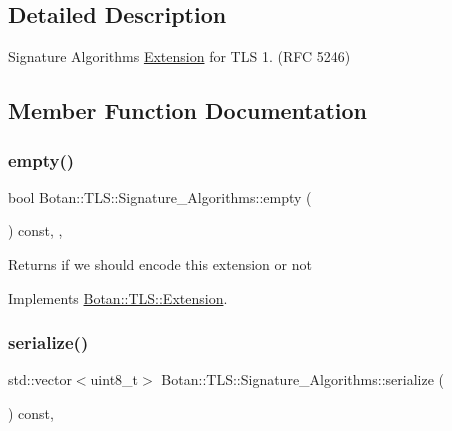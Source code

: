 \subsection{Detailed Description}
Signature Algorithms \hyperlink{class_botan_1_1_t_l_s_1_1_extension}{Extension} for T\+LS 1. (R\+FC 5246) 

\subsection{Member Function Documentation}
\mbox{\label{class_botan_1_1_t_l_s_1_1_signature___algorithms_a7216e44527a194bebce7d616d6d3fe62}} 
\subsubsection{\texorpdfstring{empty()}{empty()}}
{\footnotesize\ttfamily bool Botan\+::\+T\+L\+S\+::\+Signature\+\_\+\+Algorithms\+::empty (\begin{DoxyParamCaption}{ }\end{DoxyParamCaption}) const\hspace{0.3cm}{\ttfamily [inline]}, {\ttfamily [override]}, {\ttfamily [virtual]}}

\begin{DoxyReturn}{Returns}
if we should encode this extension or not 
\end{DoxyReturn}


Implements \hyperlink{class_botan_1_1_t_l_s_1_1_extension_aa850b9be2322f94e7c65e583cd51acc5}{Botan\+::\+T\+L\+S\+::\+Extension}.

\mbox{\label{class_botan_1_1_t_l_s_1_1_signature___algorithms_aa4363eab527673a1474a7e048e0ad616}} 
\subsubsection{\texorpdfstring{serialize()}{serialize()}}
{\footnotesize\ttfamily std\+::vector$<$uint8\+\_\+t$>$ Botan\+::\+T\+L\+S\+::\+Signature\+\_\+\+Algorithms\+::serialize (\begin{DoxyParamCaption}{ }\end{DoxyParamCaption}) const\hspace{0.3cm}{\ttfamily [override]}, {\ttfamily [virtual]}}

